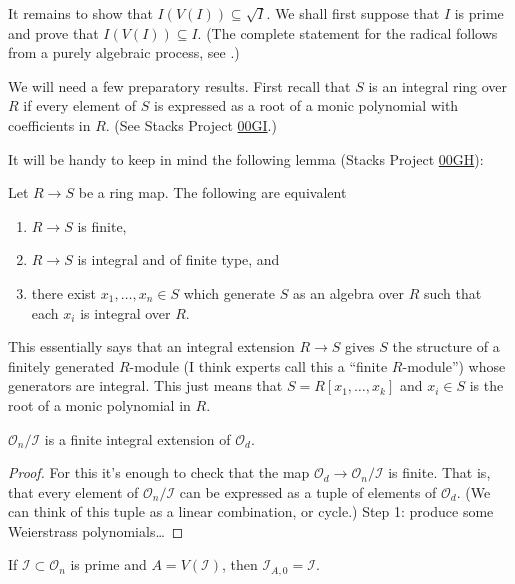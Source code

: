 It remains to show that $I(V(I)) \subseteq \sqrt{I}$.
We shall first suppose that  $I$ is prime
and prove that $I(V(I)) \subseteq I$.
(The complete statement for the radical follows
from a purely algebraic process,
see \cite[Theorem 4.22]{Demailly}.)

We will need a few preparatory results.
First recall that $S$ is an integral ring over $R$ 
if every element of $S$ is expressed as
a root of a monic polynomial with coefficients in $R$.
(See Stacks Project \href{https://stacks.math.columbia.edu/tag/00GI}{00GI}.)

It will be handy to keep in mind the following lemma
(Stacks Project \href{https://stacks.math.columbia.edu/tag/00GH}{00GH}):

\begin{lemma}
\label{lemma-characterize-finite-in-terms-of-integral}
Let $R \to S$ be a ring map. The following are equivalent
\begin{enumerate}
\item $R \to S$ is finite,
\item $R \to S$ is integral and of finite type, and
\item there exist $x_1, \ldots, x_n \in S$ which generate $S$ as an
algebra over $R$ such that each $x_i$ is integral over $R$.
\end{enumerate}
\end{lemma}

\noindent
This essentially says that an integral extension
$R \to S$ gives $S$ the structure of a finitely generated $R$-module
(I think experts call this a ``finite $R$-module'')
whose generators are integral.
This just means that $S=R[x_1,\ldots,x_k]$
and $x_i \in S$ is the root of a monic polynomial in $R$.

\begin{proposition}
\label{proposition-integral-extension}
$\mathcal{O}_n/\mathcal{I}$ is a
finite integral extension of $\mathcal{O}_d$.
\end{proposition}

\begin{proof}
For this it's enough to check that
the map $\mathcal{O}_d \to \mathcal{O}_n/\mathcal{I}$ 
is finite.
That is, that every element of $\mathcal{O}_n/\mathcal{I}$ 
can be expressed as a tuple of elements
of $\mathcal{O}_d$. 
(We can think of this tuple
as a linear combination, or cycle.)
Step 1: produce some Weierstrass polynomials…
\end{proof}

\begin{lemma}
\label{lemma-nullstellensatz}
\begin{reference}
\cite[Lemma 4.21]{Demailly}
\end{reference}
If $\mathcal{I} \subset \mathcal{O}_n$ is prime and
$A = V(\mathcal{I})$, then
$\mathcal{I}_{A,0}=\mathcal{I}$.
\end{lemma}

